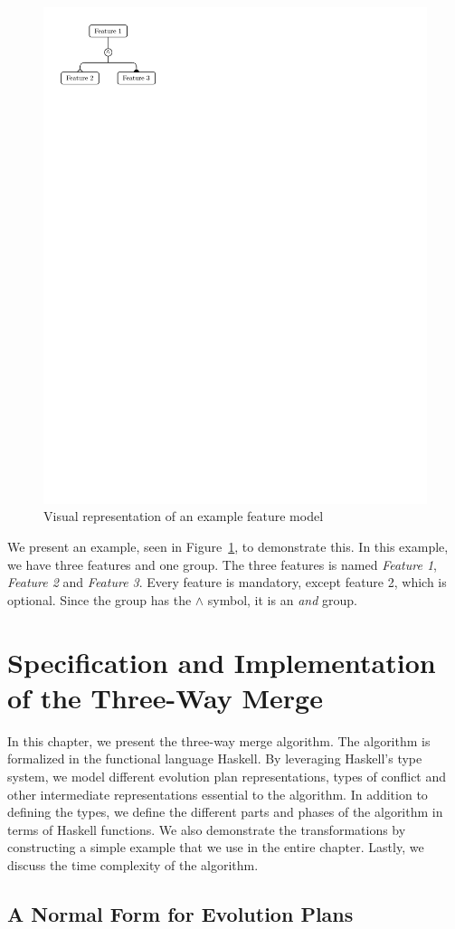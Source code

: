 \documentclass[a4paper,english]{ifimaster}
\begin{document}
\begin{figure}[htpb]
  \centering
  \includegraphics[width=0.4\linewidth]{visual_example.pdf}
  \caption{Visual representation of an example feature model}%
  \label{fig:visual_example}
\end{figure}

We present an example, seen in Figure~\ref{fig:visual_example}, to demonstrate this. In this example, we have three features and one group. The three features is named \textit{Feature 1}, \textit{Feature 2} and \textit{Feature 3}. Every feature is mandatory, except feature 2, which is optional. Since the group has the $\land$ symbol, it is an \textit{and} group.

\chapter{Specification and Implementation of the Three-Way Merge}%
\label{cha:specification_and_implementation_of_the_three_way_merge_algorithm}

In this chapter, we present the three-way merge algorithm. The algorithm is formalized in the functional language Haskell. By leveraging Haskell's type system, we model different evolution plan representations, types of conflict and other intermediate representations essential to the algorithm. In addition to defining the types, we define the different parts and phases of the algorithm in terms of Haskell functions. We also demonstrate the transformations by constructing a simple example that we use in the entire chapter. Lastly, we discuss the time complexity of the algorithm.

\section{A Normal Form for Evolution Plans}%
\label{sec:defining_a_normal_form_for_evolution_plans}
\end{document}
